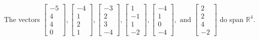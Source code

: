 \begin{exercise}
\begin{exerciseStatement}
  \end{exerciseStatement}
  \begin{exerciseAnswer}
   The vectors \(\left[\begin{array}{r}
-5 \\
4 \\
4 \\
0
\end{array}\right] , \left[\begin{array}{r}
-4 \\
1 \\
2 \\
1
\end{array}\right] , \left[\begin{array}{r}
-3 \\
2 \\
3 \\
-4
\end{array}\right] , \left[\begin{array}{r}
1 \\
-1 \\
1 \\
-2
\end{array}\right] , \left[\begin{array}{r}
-4 \\
1 \\
0 \\
-4
\end{array}\right] , \text{ and } \left[\begin{array}{r}
2 \\
2 \\
4 \\
-2
\end{array}\right]\) 
  	 do  
	span \(\mathbb{R}^4\).
  


  \end{exerciseAnswer}
\end{exercise}